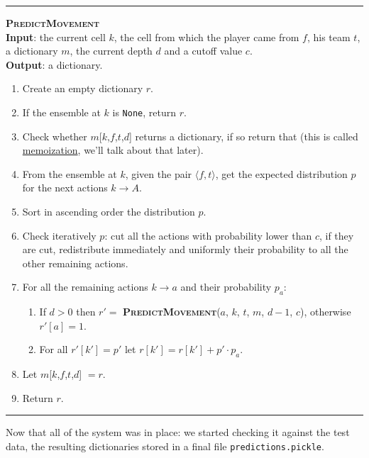 \documentclass[9pt, a4paper]{IEEEtran}
\begin{document}
    \begin{center}
        \rule{.44\textwidth}{0.4pt}
    \end{center}
    \noindent
    \textbf{\textsc{PredictMovement}}\\
    \textbf{Input}: the current cell $k$, the cell from which the player came from $f$, his team $t$, a dictionary $m$, the current depth $d$ and a cutoff value $c$.\\
    \textbf{Output}: a dictionary.
    \begin{enumerate}
        \item Create an empty dictionary $r$.
        \item If the ensemble at $k$ is \texttt{None}, return $r$.
        \item Check whether $m$[$k$,$f$,$t$,$d$] returns a dictionary, if so return that (this is called \href{https://en.wikipedia.org/wiki/Memoization}{memoization}, we'll talk about that later).
        \item From the ensemble at $k$, given the pair $\langle f, t\rangle$, get the expected distribution $p$ for the next actions $k \to A$.
        \item Sort in ascending order the distribution $p$.
        \item Check iteratively $p$: cut all the actions with probability lower than $c$, if they are cut, redistribute immediately and uniformly their probability to all the other remaining actions.
        \item For all the remaining actions $k \to a$ and their probability $p_a$:
        \begin{enumerate}
            \item If $d > 0$ then $r' =$ \textbf{\textsc{PredictMovement}}($a$, $k$, $t$, $m$, $d - 1$, $c$), otherwise $r'[a] = 1$.
            \item For all $r'[k'] = p'$ let $r[k'] = r[k'] + p' \cdot p_a$.
        \end{enumerate}
        \item Let $m$[$k$,$f$,$t$,$d$] $= r$.
        \item Return $r$.
    \end{enumerate}
    \begin{center}
        \rule{.44\textwidth}{0.4pt}
    \end{center}

    Now that all of the system was in place: we started checking it against the test data, the resulting dictionaries stored in a final file \texttt{predictions.pickle}.
\end{document}
